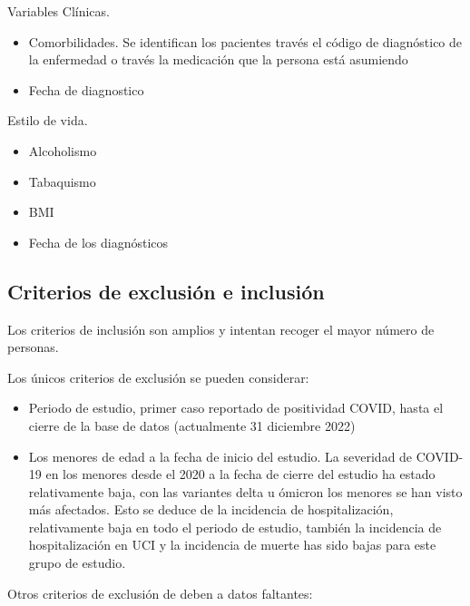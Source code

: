 \documentclass[
]{article}
\begin{document}
Variables Clínicas.

\begin{itemize}
\item
  Comorbilidades. Se identifican los pacientes través el código de
  diagnóstico de la enfermedad o través la medicación que la persona
  está asumiendo
\item
  Fecha de diagnostico
\end{itemize}

Estilo de vida.

\begin{itemize}
\item
  Alcoholismo
\item
  Tabaquismo
\item
  BMI
\item
  Fecha de los diagnósticos
\end{itemize}

\hypertarget{criterios-de-exclusiuxf3n-e-inclusiuxf3n}{%
\subsection{Criterios de exclusión e
inclusión}\label{criterios-de-exclusiuxf3n-e-inclusiuxf3n}}

Los criterios de inclusión son amplios y intentan recoger el mayor
número de personas.

Los únicos criterios de exclusión se pueden considerar:

\begin{itemize}
\item
  Periodo de estudio, primer caso reportado de positividad COVID, hasta
  el cierre de la base de datos (actualmente 31 diciembre 2022)
\item
  Los menores de edad a la fecha de inicio del estudio. La severidad de
  COVID-19 en los menores desde el 2020 a la fecha de cierre del estudio
  ha estado relativamente baja, con las variantes delta u ómicron los
  menores se han visto más afectados. Esto se deduce de la incidencia de
  hospitalización, relativamente baja en todo el periodo de estudio,
  también la incidencia de hospitalización en UCI y la incidencia de
  muerte has sido bajas para este grupo de estudio.
\end{itemize}

Otros criterios de exclusión de deben a datos faltantes:
\end{document}

